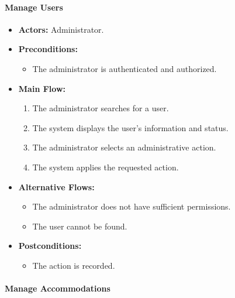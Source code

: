 \paragraph{Manage Users}

\begin{itemize}
    \item \textbf{Actors:} Administrator.
    
    \item \textbf{Preconditions:}
    \begin{itemize}
        \item The administrator is authenticated and authorized.
    \end{itemize}
    
    \item \textbf{Main Flow:}
    \begin{enumerate}
        \item The administrator searches for a user.
        \item The system displays the user's information and status.
        \item The administrator selects an administrative action.
        \item The system applies the requested action.
    \end{enumerate}
    
    \item \textbf{Alternative Flows:}
    \begin{itemize}
        \item The administrator does not have sufficient permissions.
        \item The user cannot be found.
    \end{itemize}
    
    \item \textbf{Postconditions:}
    \begin{itemize}
        \item The action is recorded.
    \end{itemize}
\end{itemize}


\paragraph{Manage Accommodations}


